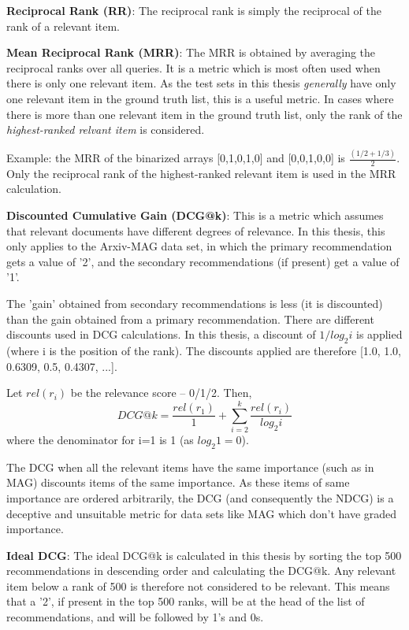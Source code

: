 \textbf{Reciprocal Rank (RR)}:
The reciprocal rank is simply the reciprocal of the rank of a relevant item. 

\textbf{Mean Reciprocal Rank (MRR)}:
The MRR is obtained by averaging the reciprocal ranks over all queries. It is a metric which is most often used when there is only one relevant item. 
As the test sets in this thesis \textit{generally} have only one relevant item in the ground truth list, this is a useful metric. In cases where there is more than one relevant item in the ground truth list, only the  rank of the \textit{highest-ranked relvant item} is considered. 

Example: the MRR of the binarized arrays [0,1,0,1,0] and [0,0,1,0,0] is $\frac{(1/2 + 1/3)}{2}$. Only the reciprocal rank of the highest-ranked relevant item is used in the MRR calculation.

\textbf{Discounted Cumulative Gain (DCG@k)}:
This is a metric which assumes that relevant documents have different degrees of relevance. In this thesis, this only applies to the Arxiv-MAG data set, in which the primary recommendation gets a value of '2', and the secondary recommendations (if present) get a value of '1'. 

The 'gain' obtained from secondary recommendations is less (it is discounted) than the gain obtained from a primary recommendation.
There are different discounts used in DCG calculations. In this thesis, a discount of $1/log_2 i$ is applied (where i is the position of the rank).
The discounts applied are therefore [1.0, 1.0, 0.6309, 0.5, 0.4307, ...]. 

Let $rel(r_i)$ be the relevance score -- 0/1/2. Then,
\begin{equation*}
    DCG@k = \frac{rel(r_1)}{1} + \sum\limits_{i=2}^k \frac{rel(r_i)}{log_2 i}
\end{equation*}
where the denominator for i=1 is 1 (as $log_2 1 = 0$). 

The DCG when all the relevant items have the same importance (such as in MAG) discounts items of the same importance. As these items of same importance are ordered arbitrarily, the DCG (and consequently the NDCG) is a deceptive and unsuitable metric for data sets like MAG which don't have graded importance.

\textbf{Ideal DCG}:
The ideal DCG@k is calculated in this thesis by sorting the top 500 recommendations in descending order and calculating the DCG@k. Any relevant item below a rank of 500 is therefore not considered to be relevant. This means that a '2', if present in the top 500 ranks, will be at the head of the list of recommendations, and will be followed by 1's and 0s.

